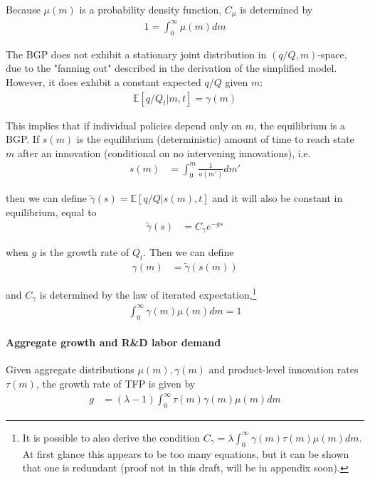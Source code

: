 \documentclass[11pt,english]{article}
\theoremstyle{remark}
\begin{document}
Because $\mu(m)$ is a probability density function, $C_\mu$ is determined by
\begin{align}
	1 = \int_0^{\infty} \mu(m) dm \label{KF_solution_2}
\end{align}

The BGP does not exhibit a stationary joint distribution in $(q/Q,m)$-space, due to the "fanning out" described in the derivation of the simplified model. However, it does exhibit a constant expected $q/Q$ given $m$:
\begin{align}
	\mathbb{E}[q/Q_t|m,t] = \gamma(m)
\end{align}

This implies that if individual policies depend only on $m$, the equilibrium is a BGP. If $s(m)$ is the equilibrium (deterministic) amount of time to reach state $m$ after an innovation (conditional on no intervening innovations), i.e.
\begin{align}
	s(m) &= \int_0^m \frac{1}{a(m')} dm'
\end{align}

then we can define $\tilde{\gamma}(s) = \mathbb{E}[q/Q|s(m),t]$ and it will also be constant in equilibrium, equal to
\begin{align}
	\tilde{\gamma}(s) &= C_{\gamma} e^{-gs}
\end{align}

when $g$ is the growth rate of $Q_t$. Then we can define
\begin{align}
	\gamma(m) &= \tilde{\gamma}(s(m))
\end{align}

and $C_{\gamma}$ is determined by the law of iterated expectation,\footnote{It is possible to also derive the condition $C_{\gamma} = \lambda \int_0^{\infty} \gamma(m) \tau(m) \mu(m) dm$. At first glance this appears to be too many equations, but it can be shown that one is redundant (proof not in this draft, will be in appendix soon).}
\begin{align}
	\int_0^{\infty} \gamma(m) \mu(m) dm = 1
\end{align}

\paragraph{Aggregate growth and R\&D labor demand}

Given aggregate distributions $\mu(m),\gamma(m)$ and product-level innovation rates $\tau(m)$, the growth rate of TFP is given by
\begin{align}
	g &= (\lambda -1) \int_0^{\infty} \tau(m) \gamma(m) \mu(m) dm 
\end{align}
\end{document}
